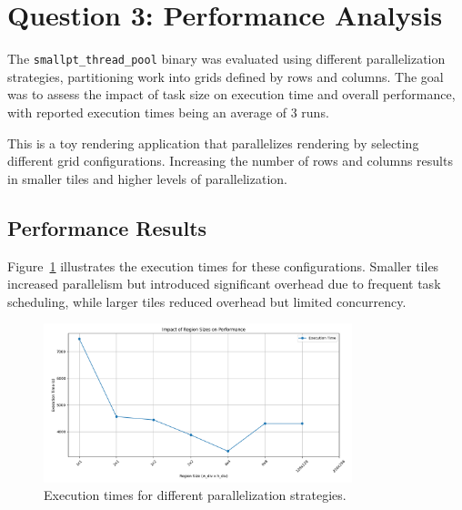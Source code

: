 \documentclass{article}
\begin{document}
\section*{Question 3: Performance Analysis}
The \texttt{smallpt\_thread\_pool} binary was evaluated using
 different parallelization strategies, partitioning work into grids defined by rows and columns. 
 The goal was to assess the impact of task size on execution time and overall performance, with 
 reported execution times being an average of 3 runs.

This is a toy rendering application that parallelizes rendering 
by selecting different grid configurations. Increasing the number of rows
and columns results in smaller tiles and higher levels of parallelization.

\subsection*{Performance Results}
Figure~\ref{fig:performance_plot} illustrates the execution times for these configurations. Smaller tiles increased parallelism but introduced significant overhead due to frequent task scheduling, while larger tiles reduced overhead but limited concurrency.

\begin{figure}[h]
    \centering
    \includegraphics[width=0.8\textwidth]{./results/performance.png}
    \caption{Execution times for different parallelization strategies.}
    \label{fig:performance_plot}
\end{figure}
\end{document}

